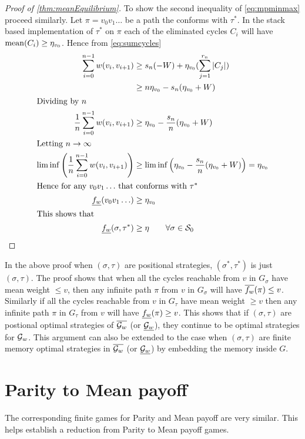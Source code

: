 \begin{proof}[Proof of \autoref{thm:meanEquilibrium}]
    To show the second inequality of \eqref{eq:mpminmax} proceed similarly. Let $\pi=v_0 v_1 \ldots$ be a path the conforms with $\tau^*$. In the stack based implementation of $\tau^*$ on $\pi$ each of the eliminated cycles $C_i$ will have $\operatorname*{mean}(C_i) \geq \eta_{v_0}$. Hence from \eqref{eq:sumcycles}
    \begin{align*}
        \sum_{i=0}^{n-1} w(v_i,v_{i+1}) &\geq s_n (-W) + \eta_{v_0}(\sum_{j=1}^{r_n} |C_j|)\\
        &\geq n \eta_{v_0} - s_n (\eta_{v_0}+W)\\
        \intertext{Dividing by $n$}
        \frac{1}{n} \sum_{i=0}^{n-1} w(v_i,v_{i+1}) &\geq \eta_{v_0} - \frac{s_n}{n}(\eta_{v_0}+W)\\
        \intertext{Letting $n \to \infty$}
        \liminf \left( \frac{1}{n} \sum_{i=0}^{n-1} w(v_i,v_{i+1}) \right) &\geq \liminf \left( \eta_{v_0} - \frac{s_n}{n}(\eta_{v_0}+W) \right) = \eta_{v_0}\\
        \intertext{Hence for any $v_0 v_1 \ldots$ that conforms with $\tau^*$}
        \underline{f_w}(v_0 v_1 \ldots ) &\geq \eta_{v_0}\\
        \intertext{This shows that}
        \underline{f_w}(\sigma,\tau^*) &\geq \eta \qquad \forall \sigma \in \mathcal{S}_0
    \end{align*}
\end{proof}

In the above proof when $(\sigma,\tau)$ are positional strategies, $(\sigma^*,\tau^*)$ is just $(\sigma,\tau)$. The proof shows that when all the cycles reachable from $v$ in $G_{\sigma}$ have mean weight $\leq v$, then any infinite path $\pi$ from $v$ in $G_{\sigma}$ will have $\overline{f_w}(\pi) \leq v$. Similarly if all the cycles reachable from $v$ in $G_\tau$ have mean weight $\geq v$ then any infinite path $\pi$ in $G_{\tau}$ from $v$ will have $\underline{f_w}(\pi) \geq v$. This shows that if $(\sigma,\tau)$ are postional optimal strategies of $\overline{\mathcal{G}_w}$ (or $\underline{\mathcal{G}_w}$), they continue to be optimal strategies for $\mathcal{G}_w$. This argument can also be extended to the case when $(\sigma,\tau)$ are finite memory optimal strategies in $\overline{\mathcal{G}_w}$ (or $\underline{\mathcal{G}_w}$) by embedding the memory inside $G$.

\section{Parity to Mean payoff}

The corresponding finite games for Parity and Mean payoff are very similar. This helps establish a reduction from Parity  to Mean payoff games.

